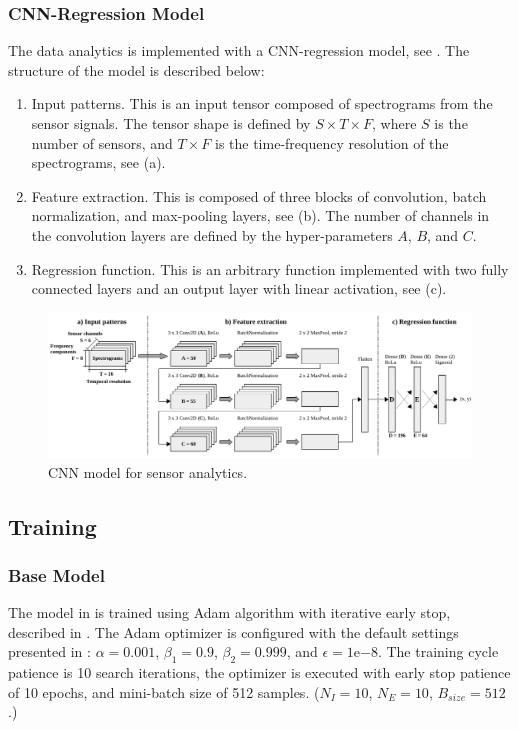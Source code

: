 \subsubsection{CNN-Regression Model}
The data analytics is implemented with a CNN-regression model, see . The structure of the model is described below:

\begin{enumerate}[label=\alph*)]
\item Input patterns. This is an input tensor composed of spectrograms from the sensor signals. The tensor shape is defined by $S \times T \times F$, where $S$ is the number of sensors, and $T \times F$ is the time-frequency resolution of the spectrograms, see (a).

\item Feature extraction. This is composed of three blocks of convolution, batch normalization, and max-pooling layers, see (b). The number of channels in the convolution layers are defined by the hyper-parameters $A$, $B$, and $C$.

\item Regression function. This is an arbitrary function implemented with two fully connected layers and an output layer with linear activation, see (c).
\end{enumerate}


\begin{figure}[t!]
	\centering
	\includegraphics[width=\textwidth]{../figures/model.pdf}
	\caption{CNN model for sensor analytics.}
	\label{fig:model}
\end{figure}


\subsection{Training}
\subsubsection{Base Model}
The model in  is trained using Adam algorithm with iterative early stop, described in . The Adam optimizer is configured with the default settings presented in \cite{kingma2014adam}: $\alpha = 0.001$, $\beta_1 = 0.9$, $\beta_2 = 0.999$, and $\epsilon = 1\mathrm{e}{-8}$. The training cycle patience is 10 search iterations, the optimizer is executed with early stop patience of 10 epochs, and mini-batch size of 512 samples. ($N_I = 10$, $N_E=10$, $B_{size}=512$.)

